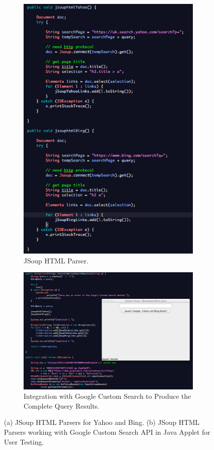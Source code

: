 \documentclass[a4paper, 11pt]{article}
\begin{document}
\begin{figure}[H]
\centering
\begin{subfigure}{.5\textwidth}
  \centering
  \includegraphics[width=.7\linewidth]{htmlParsers}
  \caption{JSoup HTML Parser.}
\end{subfigure}%
\begin{subfigure}{.5\textwidth}
  \centering
  \includegraphics[width=.7\linewidth]{Applet}
  \caption{Integration with Google Custom Search to Produce the Complete Query Results.}
\end{subfigure}
\caption{(a) JSoup HTML Parsers for Yahoo and Bing. (b) JSoup HTML Parsers working with Google Custom Search API in Java Applet for User Testing.}
\label{AppletFig}
\end{figure}
\end{document}
